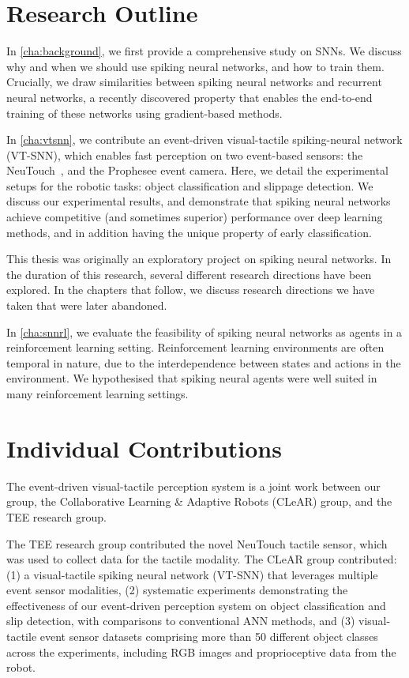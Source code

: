 \documentclass[fyp]{socreport}
\begin{document}
\section{Research Outline}

In \autoref{cha:background}, we first provide a comprehensive study on SNNs. We
discuss why and when we should use spiking neural networks, and how to train
them. Crucially, we draw similarities between spiking neural networks and
recurrent neural networks, a recently discovered property that enables the
end-to-end training of these networks using gradient-based methods.

In \autoref{cha:vtsnn}, we contribute an event-driven visual-tactile
spiking-neural network (VT-SNN), which enables fast perception on two
event-based sensors: the NeuTouch~\cite{aiskinLee}, and the Prophesee event
camera. Here, we detail the experimental setups for the robotic tasks: object
classification and slippage detection. We discuss our experimental results, and
demonstrate that spiking neural networks achieve competitive (and sometimes
superior) performance over deep learning methods, and in addition having the
unique property of early classification.

This thesis was originally an exploratory project on spiking neural networks.
In the duration of this research, several different research directions have
been explored. In the chapters that follow, we discuss research directions we
have taken that were later abandoned.

In \autoref{cha:snnrl}, we evaluate the feasibility of spiking neural networks
as agents in a reinforcement learning setting. Reinforcement learning
environments are often temporal in nature, due to the interdependence between
states and actions in the environment. We hypothesised that spiking neural
agents were well suited in many reinforcement learning settings.

\section{Individual Contributions}
The event-driven visual-tactile perception system is a joint work between our
group, the Collaborative Learning \& Adaptive Robots (CLeAR) group, and the TEE
research group.

The TEE research group contributed the novel NeuTouch tactile sensor, which was
used to collect data for the tactile modality. The CLeAR group contributed: (1) a
visual-tactile spiking neural network (VT-SNN) that leverages multiple event
sensor modalities, (2) systematic experiments demonstrating the effectiveness of
our event-driven perception system on object classification and slip detection,
with comparisons to conventional ANN methods, and (3) visual-tactile event
sensor datasets comprising more than 50 different object classes across the
experiments, including RGB images and proprioceptive data from the robot.
\end{document}
